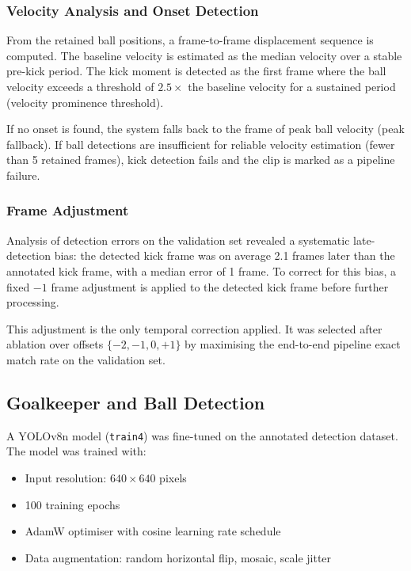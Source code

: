 \documentclass[12pt,a4paper,twoside]{article}
\begin{document}
\subsubsection{Velocity Analysis and Onset Detection}

From the retained ball positions, a frame-to-frame displacement sequence is
computed. The baseline velocity is estimated as the median velocity over a
stable pre-kick period. The kick moment is detected as the first frame where
the ball velocity exceeds a threshold of $2.5 \times$ the baseline velocity for
a sustained period (velocity prominence threshold).

If no onset is found, the system falls back to the frame of peak ball velocity
(peak fallback). If ball detections are insufficient for reliable velocity
estimation (fewer than 5 retained frames), kick detection fails and the clip
is marked as a pipeline failure.

\subsubsection{Frame Adjustment}

Analysis of detection errors on the validation set revealed a systematic
late-detection bias: the detected kick frame was on average 2.1 frames later
than the annotated kick frame, with a median error of 1 frame. To correct for
this bias, a fixed $-1$ frame adjustment is applied to the detected kick frame
before further processing.

This adjustment is the only temporal correction applied. It was selected after
ablation over offsets $\{-2, -1, 0, +1\}$ by maximising the end-to-end pipeline
exact match rate on the validation set.

\subsection{Goalkeeper and Ball Detection}

A YOLOv8n model (\texttt{train4}) was fine-tuned on the annotated detection
dataset. The model was trained with:
\begin{itemize}
  \item Input resolution: $640 \times 640$ pixels
  \item 100 training epochs
  \item AdamW optimiser with cosine learning rate schedule
  \item Data augmentation: random horizontal flip, mosaic, scale jitter
\end{itemize}
\end{document}
